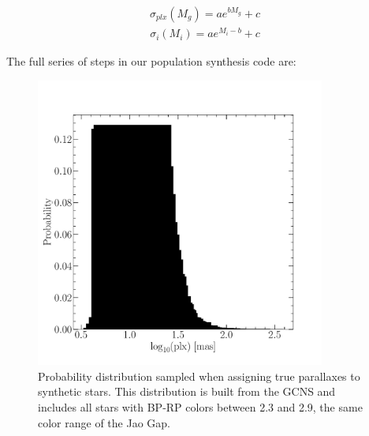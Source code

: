 \begin{align}\label{eqn:plxCalib}
	\sigma_{plx}(M_{g}) = ae^{bM_{g}}+c
\end{align}
\begin{align}\label{eqn:MagCalib}
	\sigma_{i}(M_{i}) = ae^{M_{i}-b}+c
\end{align}

\noindent The full series of steps in our population synthesis code
are:

\begin{figure}
	\centering
	\includegraphics[width=0.85\textwidth]{figures/jaoOpacity/pdist.pdf}
	\caption{Probability distribution sampled when assigning true parallaxes to
	synthetic stars. This distribution is built from the GCNS and includes all
	stars with BP-RP colors between 2.3 and 2.9, the same color range
	of the Jao Gap.}
	\label{fig:pdist}
\end{figure}

